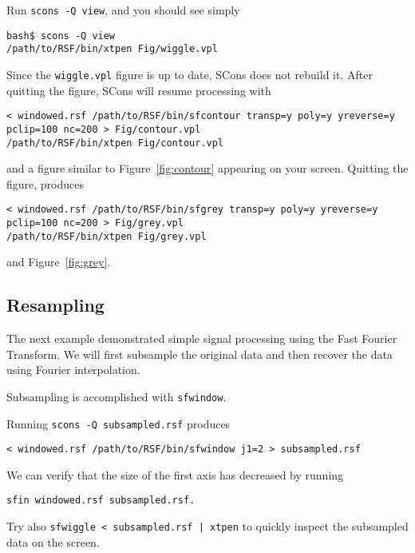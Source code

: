 Run \texttt{scons -Q view}, and you should see simply
\begin{verbatim}
bash$ scons -Q view
/path/to/RSF/bin/xtpen Fig/wiggle.vpl
\end{verbatim}
Since the \texttt{wiggle.vpl} figure is up to date, SCons does not rebuild
it. After quitting the figure, SCons will resume processing with
\begin{verbatim}
< windowed.rsf /path/to/RSF/bin/sfcontour transp=y poly=y yreverse=y 
pclip=100 nc=200 > Fig/contour.vpl
/path/to/RSF/bin/xtpen Fig/contour.vpl
\end{verbatim}
and a figure similar to Figure~\ref{fig:contour} appearing on your
screen. Quitting the figure, produces
\begin{verbatim}
< windowed.rsf /path/to/RSF/bin/sfgrey transp=y poly=y yreverse=y 
pclip=100 nc=200 > Fig/grey.vpl
/path/to/RSF/bin/xtpen Fig/grey.vpl
\end{verbatim}
and Figure~\ref{fig:grey}.


\subsection{Resampling}

The next example demonstrated simple signal processing using the Fast Fourier
Transform. We will first subsample the original data and then recover the data
using Fourier interpolation.

Subsampling is accomplished with \texttt{sfwindow}.


Running \texttt{scons -Q subsampled.rsf} produces
\begin{verbatim}
< windowed.rsf /path/to/RSF/bin/sfwindow j1=2 > subsampled.rsf
\end{verbatim}
We can verify that the size of the first axis has decreased by running

\begin{verbatim}
sfin windowed.rsf subsampled.rsf. 
\end{verbatim}

Try also \texttt{sfwiggle < subsampled.rsf | xtpen} to quickly inspect the subsampled data on the screen.

